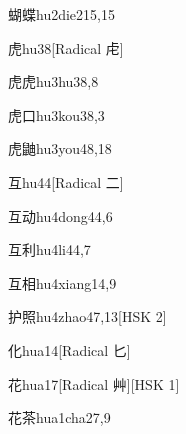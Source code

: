 \begin{entry}{蝴蝶}{hu2die2}{15,15}
\end{entry}

\begin{entry}{虎}{hu3}{8}[Radical ⾌]
\end{entry}

\begin{entry}{虎虎}{hu3hu3}{8,8}
\end{entry}

\begin{entry}{虎口}{hu3kou3}{8,3}
\end{entry}

\begin{entry}{虎鼬}{hu3you4}{8,18}
\end{entry}

\begin{entry}{互}{hu4}{4}[Radical ⼆]
\end{entry}

\begin{entry}{互动}{hu4dong4}{4,6}
\end{entry}

\begin{entry}{互利}{hu4li4}{4,7}
\end{entry}

\begin{entry}{互相}{hu4xiang1}{4,9}
\end{entry}

\begin{entry}{护照}{hu4zhao4}{7,13}[HSK 2]
\end{entry}

\begin{entry}{化}{hua1}{4}[Radical 匕]
\end{entry}

\begin{entry}{花}{hua1}{7}[Radical 艸][HSK 1]
\end{entry}

\begin{entry}{花茶}{hua1cha2}{7,9}
\end{entry}

